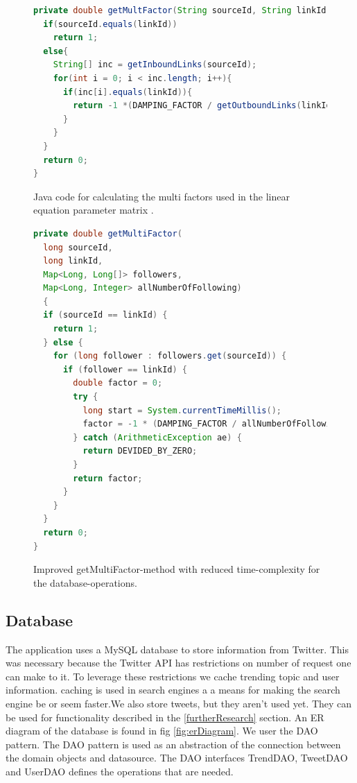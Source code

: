 \begin{figure}[h!]
\begin{lstlisting}[language=java]
private double getMultFactor(String sourceId, String linkId){ 
  if(sourceId.equals(linkId)) 
    return 1;
  else{
    String[] inc = getInboundLinks(sourceId); 
    for(int i = 0; i < inc.length; i++){ 
      if(inc[i].equals(linkId)){ 
        return -1 *(DAMPING_FACTOR / getOutboundLinks(linkId).length);
      } 
    }
  } 
  return 0;
}
\end{lstlisting}
\caption{Java code for calculating the multi factors used in the linear equation parameter matrix \protect \cite{Goodrarzi2009}.}
\label{fig:getmultifactor}
\end{figure}

\begin{figure}[h!]
\begin{lstlisting}[language=java]
private double getMultiFactor(
  long sourceId, 
  long linkId, 
  Map<Long, Long[]> followers, 
  Map<Long, Integer> allNumberOfFollowing) 
  {
  if (sourceId == linkId) {
    return 1;
  } else {
    for (long follower : followers.get(sourceId)) {
      if (follower == linkId) {
        double factor = 0;
        try {
          long start = System.currentTimeMillis();
          factor = -1 * (DAMPING_FACTOR / allNumberOfFollowing.get(linkId));
        } catch (ArithmeticException ae) {
          return DEVIDED_BY_ZERO;
        }
        return factor;
      }
    }
  }
  return 0;
}
\end{lstlisting}
\caption{Improved getMultiFactor-method with reduced time-complexity for the database-operations.}
\label{fig:getmultifactorimproved}
\end{figure}



\subsection{Database} %
\label{feedJamDatabase}
The application uses a MySQL database to store information from Twitter. This was necessary because the Twitter API has restrictions on number of request one can make to it. To leverage these restrictions we cache trending topic and user information. \citep{boka kap11} caching is used in search engines a a means for making the search engine be or seem faster.We also store tweets, but they aren't used yet. They can be used for functionality described in the \ref{furtherResearch} section. An ER diagram of the database is found in fig \ref{fig:erDiagram}.
We user the DAO pattern. The DAO pattern is used as an abstraction of the connection between the domain objects and datasource. The DAO interfaces TrendDAO, TweetDAO and UserDAO defines the operations that are needed.


